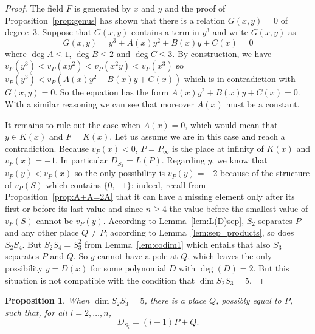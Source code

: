 \documentclass[10pt]{amsart}
\newtheorem{prop}[theo]{Proposition}
\theoremstyle{definition}
\theoremstyle{remark}
\renewcommand{\geq}{\geqslant}
\renewcommand{\leq}{\leqslant}
\begin{document}
\begin{proof}
The field $F$ is generated by $x$ and $y$ and the proof of Proposition~\ref{prop:genus} has shown that there is a relation $G(x,y)=0$ of degree~$3$. Suppose that $G(x,y)$ contains a term in $y^3$ and write $G(x,y)$ as
\begin{equation*}
G(x, y)= y^3 + A(x)y^2 + B(x)y + C(x)=0
\end{equation*}
where $\deg A\leq1$, $\deg B\leq2$ and $\deg C\leq3$. By construction, we have $v_P(y^3)<v_P(xy^2)<v_P(x^2y)<v_P(x^3)$ so $v_P(y^3)<v_P(A(x)y^2+B(x)y+C(x))$ which is in contradiction with $G(x,y)=0$. So the equation has the form $A(x)y^2 + B(x)y + C(x)=0$. With a similar reasoning we can see that moreover $A(x)$ must be a constant.

It remains to rule out the case when $A(x)=0$, which would mean that $y\in K(x)$ and $F=K(x)$. Let us assume we are in this case and reach a contradiction. Because $v_P(x)<0$, $P=P_\infty$ is the place at infinity of $K(x)$ and $v_P(x)=-1$. In particular $D_{S_2}=L(P)$. Regarding $y$, we know that $v_P(y)<v_P(x)$ so the only possibility is $v_P(y)=-2$ because of the structure of $v_P(S)$ which contains $\{0,-1\}$: indeed, recall from Proposition~\ref{prop:A+A=2A} that it can have a missing element only after its first or before its last value and since $n\geq4$ the value before the smallest value of $v_P(S)$ cannot be $v_P(y)$. According to Lemma~\ref{lem:L(D)sep}, $S_2$ separates $P$ and any other place $Q\neq P$; according to Lemma~\ref{lem:sep_products}, so does $S_2S_4$. But $S_2S_4=S_3^2$ from Lemma~\ref{lem:codim1} which entails that also $S_3$ separates $P$ and $Q$. So $y$ cannot have a pole at $Q$, which leaves the only possibility $y=D(x)$ {for some polynomial $D$ with} $\deg(D)=2$. But this situation is not compatible with the condition that $\dim S_2S_3=5$.
\end{proof}

\begin{prop}
When $\dim S_2S_3=5$, there is a place $Q$, possibly equal to $P$, such that, for all $i=2,\ldots,n$,
\[
D_{S_i}=(i-1)P+Q.
\]
\end{prop}
\end{document}
